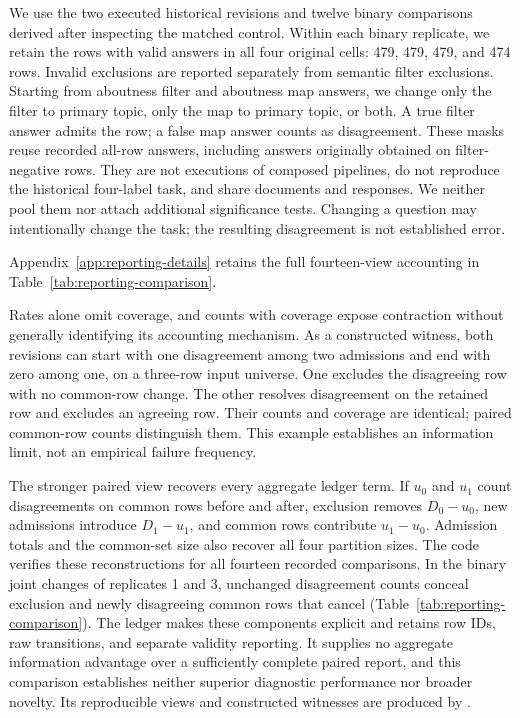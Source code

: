\documentclass[11pt]{article}
\begin{document}
We use the two executed historical revisions and twelve binary comparisons
derived after inspecting the matched control. Within each binary replicate,
we retain the rows with valid answers in all four original cells: 479, 479,
479, and 474 rows. Invalid exclusions are reported separately from semantic
filter exclusions. Starting from aboutness filter and aboutness map answers,
we change only the filter to primary topic, only the map to primary topic,
or both. A true filter answer admits the row; a false map answer counts as
disagreement. These masks reuse recorded all-row answers, including answers
originally obtained on filter-negative rows. They are not executions of
composed pipelines, do not reproduce the historical four-label task, and
share documents and responses. We neither pool them nor attach additional
significance tests. Changing a question may intentionally change the task;
the resulting disagreement is not established error.

Appendix~\ref{app:reporting-details} retains the full fourteen-view accounting in Table~\ref{tab:reporting-comparison}.

Rates alone omit coverage, and counts with coverage expose contraction
without generally identifying its accounting mechanism. As a constructed
witness, both revisions can start with one disagreement among two admissions
and end with zero among one, on a three-row input universe. One excludes the
disagreeing row with no common-row change. The other resolves disagreement
on the retained row and excludes an agreeing row. Their counts and coverage
are identical; paired common-row counts distinguish them. This example
establishes an information limit, not an empirical failure frequency.

The stronger paired view recovers every aggregate ledger term. If $u_0$
and $u_1$ count disagreements on common rows before and after, exclusion
removes $D_0-u_0$, new admissions introduce $D_1-u_1$, and common rows
contribute $u_1-u_0$. Admission totals and the common-set size also recover
all four partition sizes. The code verifies these reconstructions for all
fourteen recorded comparisons. In the binary joint changes of replicates
1 and 3, unchanged disagreement counts conceal exclusion and newly
disagreeing common rows that cancel (Table~\ref{tab:reporting-comparison}).
The ledger makes these components explicit and retains row IDs, raw
transitions, and separate validity reporting. It supplies no aggregate
information advantage over a sufficiently complete paired report, and this
comparison establishes neither superior diagnostic performance nor broader
novelty. Its reproducible views and constructed witnesses are produced by
.
\end{document}
